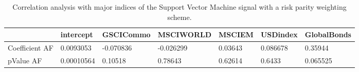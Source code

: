 \begin{table}[H]
\centering
\begin{tabular}{lllllll}
& intercept & GSCICommo & MSCIWORLD & MSCIEM & USDindex & GlobalBonds \\ 
\hline 
Coefficient AF & 0.0093053 & -0.070836 & -0.026299 & 0.03643 & 0.086678 & 0.35944 \\ 
pValue AF & 0.00010564 & 0.10518 & 0.78643 & 0.62614 & 0.6433 & 0.065525 \\ 
\hline
\end{tabular}
\caption{Correlation analysis with major indices of the Support Vector Machine signal with a risk parity weighting scheme.}
\label{SVM_MODEL_Risk_AFACTOR}
\end{table}
